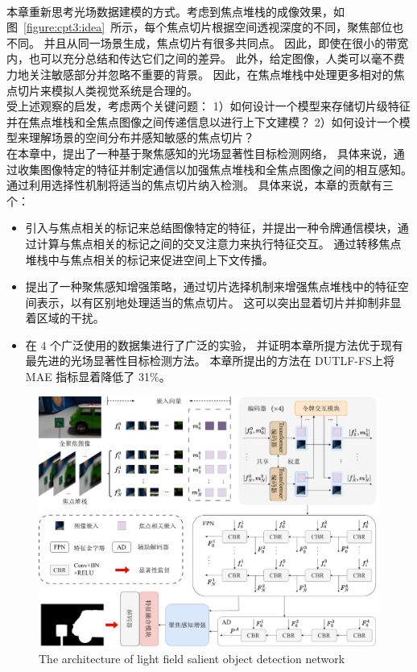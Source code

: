 \\
%
%
%
%
\indent 
本章重新思考光场数据建模的方式。考虑到焦点堆栈的成像效果，如图~\ref{figure:cpt3:idea}~所示，每个焦点切片根据空间透视深度的不同，聚焦部位也不同。 并且从同一场景生成，焦点切片有很多共同点。
因此，即使在很小的带宽内，也可以充分总结和传达它们之间的差异。 此外，给定图像，人类可以毫不费力地关注敏感部分并忽略不重要的背景。 因此，在焦点堆栈中处理更多相对的焦点切片来模拟人类视觉系统是合理的。 
\\
%
%
%
%
\indent
受上述观察的启发，考虑两个关键问题：
1）如何设计一个模型来存储切片级特征并在焦点堆栈和全焦点图像之间传递信息以进行上下文建模？ 
2）如何设计一个模型来理解场景的空间分布并感知敏感的焦点切片？ 
\\
%
%
%
%
\indent
在本章中，提出了一种基于聚焦感知的光场显著性目标检测网络，
具体来说，通过收集图像特定的特征并制定通信以加强焦点堆栈和全焦点图像之间的相互感知。 
通过利用选择性机制将适当的焦点切片纳入检测。 
具体来说，本章的贡献有三个：
\begin{itemize}
	\item 引入与焦点相关的标记来总结图像特定的特征，并提出一种令牌通信模块，通过计算与焦点相关的标记之间的交叉注意力来执行特征交互。 通过转移焦点堆栈中与焦点相关的标记来促进空间上下文传播。 
	\item 提出了一种聚焦感知增强策略，通过切片选择机制来增强焦点堆栈中的特征空间表示，以有区别地处理适当的焦点切片。	这可以突出显着切片并抑制非显着区域的干扰。 
	\item 在 4 个广泛使用的数据集进行了广泛的实验，
	并证明本章所提方法优于现有最先进的光场显著性目标检测方法。 本章所提出的方法在 DUTLF-FS上将 MAE 指标显着降低了 31\%。
\end{itemize}
%
%
\begin{figure}[!ht]
	\centering
	\includegraphics[width=0.95\linewidth]{figures/chapter3/overview_1}
	{The architecture of light field salient object detection network}  
	\label{cpt3_fig1:overview}
\end{figure}
